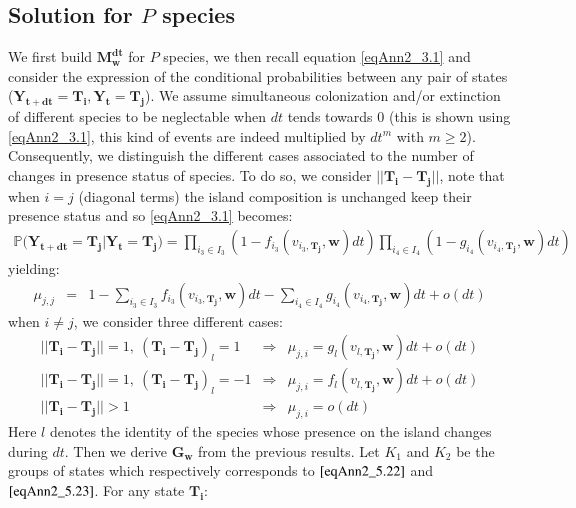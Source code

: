 \subsection{Solution for $P$ species}

We first build $\mathbf{M_w^{dt}}$ for $P$ species, we then recall equation \eqref{eqAnn2_3.1} and consider the expression of the conditional probabilities between any pair of states ($\mathbf{Y_{t+dt}}=\mathbf{T_i},\mathbf{Y_t}=\mathbf{T_j}$).
We assume simultaneous colonization and/or extinction of different species to be neglectable when $dt$ tends towards 0 (this is shown using \eqref{eqAnn2_3.1}, this kind of events are indeed multiplied by $dt^m$ with $m\geqslant2$). Consequently, we distinguish the different cases associated to the number of changes in presence status of species. To do so, we consider $||\mathbf{T_i}-\mathbf{T_j}||$, note that when $i=j$ (diagonal terms) the island composition is unchanged keep their presence status and so \eqref{eqAnn2_3.1} becomes:
\begin{eqnarray}
\mathbb{P}(\mathbf{Y_{t+dt}=\mathbf{T_j} | \mathbf{Y_{t}=\mathbf{T_j})}} = \prod_{i_3 \in I_3}(1-f_{i_3}(v_{i_3,\mathbf{T_j}}, \mathbf{w})dt)\prod_{i_4 \in I_4}(1-g_{i_4}(v_{i_4,\mathbf{T_j}}, \mathbf{w})dt)
\end{eqnarray}
yielding:
\begin{eqnarray}
\mu_{j,j} &=& 1-\sum_{i_3 \in I_3}f_{i_3}(v_{i_3,\mathbf{T_j}}, \mathbf{w})dt- \sum_{i_4 \in I_4}g_{i_4}(v_{i_4,\mathbf{T_j}}, \mathbf{w})dt+o(dt)
\end{eqnarray}
when $i\neq j$, we consider three different cases:
\begin{eqnarray}
\label{eqAnn2_5.22} ||\mathbf{T_i}-\mathbf{T_j}|| = 1, ~(\mathbf{T_i}-\mathbf{T_j})_l=1 &\Rightarrow& \mu_{j,i}= g_l(v_{l,\mathbf{T_j}}, \mathbf{w})dt+ o(dt) \\
\label{eqAnn2_5.23} ||\mathbf{T_i}-\mathbf{T_j}||  =1  , ~(\mathbf{T_i}-\mathbf{T_j})_l=-1 &\Rightarrow& \mu_{j,i}= f_l(v_{l,\mathbf{T_j}}, \mathbf{w})dt+o(dt) \\
||\mathbf{T_i}-\mathbf{T_j}||  >1 &\Rightarrow& \mu_{j,i}=o(dt)
\end{eqnarray}
Here $l$ denotes the identity of the species whose presence on the island changes during $dt$. Then we derive $\mathbf{G_w}$ from the previous results. Let $K_1$ and $K_2$ be the groups of states which respectively corresponds to $\eqref{eqAnn2_5.22}$ and $\eqref{eqAnn2_5.23}$. For any state $\mathbf{T_i}$:
